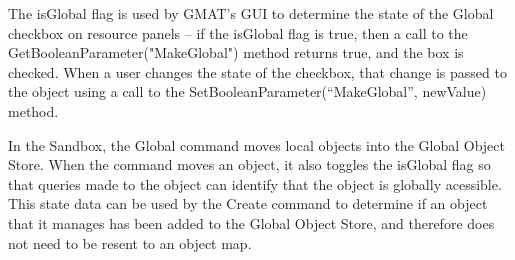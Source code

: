 The isGlobal flag is used by GMAT's GUI to determine the state of the Global checkbox on resource
panels -- if the isGlobal flag is true, then a call to the Get\-Boolean\-Parameter(\-"MakeGlobal")
method returns true, and the box is checked.  When a user changes the state of the checkbox, that
change is passed to the object using a call to the Set\-Boolean\-Parameter(\-``MakeGlobal'',
newValue) method.

In the Sandbox, the Global command moves local objects into the Global Object Store.  When the
command moves an object, it also toggles the isGlobal flag so that queries made to the object can
identify that the object is globally acessible.  This state data can be used by the Create command
to determine if an object that it manages has been added to the Global Object Store, and therefore
does not need to be resent to an object map.
